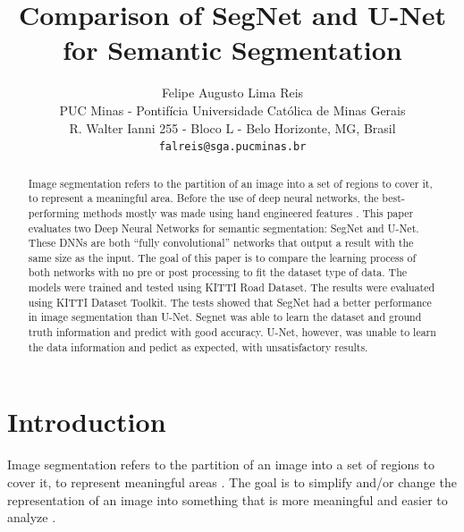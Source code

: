 \documentclass[10pt,twocolumn,letterpaper]{article}
\begin{document}
\title{Comparison of SegNet and U-Net for Semantic Segmentation}

\author{Felipe Augusto Lima Reis\\
PUC Minas - Pontif\'icia Universidade Cat\'olica de Minas Gerais\\
R. Walter Ianni 255 - Bloco L - Belo Horizonte, MG, Brasil\\
{\tt\small falreis@sga.pucminas.br}
}

\maketitle


\begin{abstract}
    Image segmentation refers to the partition of an image into a set of regions to cover it, to represent a meaningful area. Before the use of deep neural networks, the best-performing methods mostly was made using hand engineered features \cite{SEGNET}. This paper evaluates two Deep Neural Networks for semantic segmentation: SegNet and U-Net. These DNNs are both ``fully convolutional'' networks that output a result with the same size as the input. The goal of this paper is to compare the learning process of both networks with no pre or post processing to fit the dataset type of data. The models were trained and tested using KITTI Road Dataset. The results were evaluated using KITTI Dataset Toolkit. The tests showed that SegNet had a better performance in image segmentation than U-Net. Segnet was able to learn the dataset and ground truth information and predict with good accuracy. U-Net, however, was unable to learn the data information and pedict as expected, with unsatisfactory results.
\end{abstract}



\section{Introduction} \label{introduction}

Image segmentation refers to the partition of an image into a set of regions to cover it, to represent meaningful areas \cite{DOMINGUEZ}. The goal is to simplify and/or change the representation of an image into something that is more meaningful and easier to analyze \cite{AHMED_SARMA}.
\end{document}
